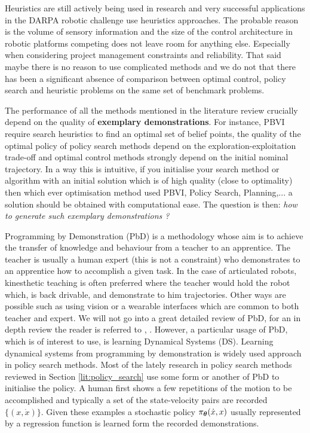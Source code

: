 Heuristics are still actively being used in research and very successful applications in the DARPA robotic 
challenge use heuristics approaches. The probable reason is the volume of sensory information 
and the size of the control architecture in robotic platforms competing does not leave room for anything else. Especially  
when considering project management constraints and reliability. That said maybe there is no reason to use complicated 
methods and we do not that there has been a significant absence of comparison between optimal control, policy search 
and heuristic problems on the same set of benchmark problems. 

The performance of all the methods mentioned in the literature review crucially depend on the quality of 
\textbf{exemplary demonstrations}. For instance, PBVI require search heuristics to find an optimal set of belief points, 
the quality of the optimal policy of policy search methods depend on the exploration-exploitation trade-off
and optimal control methods strongly depend on the initial nominal trajectory. In a way this is intuitive, 
if you initialise your search method or algorithm with an initial solution which is of high quality (close to optimality) 
then which ever optimisation method used PBVI, Policy Search, Planning,... a solution should be obtained with 
computational ease. The question is then: \textit{how to generate such exemplary demonstrations ?} 

Programming by Demonstration (PbD) is a methodology whose aim is to achieve the transfer of knowledge and behaviour from a teacher to an apprentice. The teacher 
is usually a human expert (this is not a constraint) who demonstrates to an apprentice how to accomplish a given task. In the case of articulated robots, 
kinesthetic teaching is often preferred where the teacher would hold the robot which, is back drivable, and demonstrate to him trajectories. Other ways are possible
such as using vision or a wearable interfaces which are common to both teacher and expert. We will not go into a great detailed review of PbD, for an in depth review 
the reader is referred to \cite{Billard08chapter}, \cite{Billard_schol_2013}. However, a particular usage of PbD, which is of interest to use, is learning Dynamical Systems (DS).
Learning dynamical systems from programming by demonstration is widely used approach in policy search methods. Most of the lately research in policy search methods reviewed 
in Section \ref{lit:policy_search} use some form or another of PbD to initialise the policy. A human first shows a few repetitions of the 
motion to be accomplished and typically a set of the state-velocity pairs are recorded $\{(x,\dot{x})\}$. Given these examples a stochastic policy $\operatorname{\pi_{\boldsymbol{\theta}}}(\dot{x},x)$ 
usually represented by a regression function is learned form the recorded demonstrations. 

